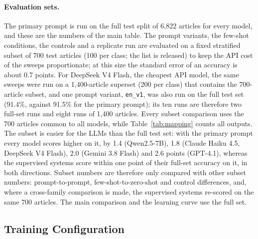 \documentclass[preprint,12pt,authoryear]{elsarticle}
\newif\ifrevmarkup
\DeclareRobustCommand{\rev}[1]{\ifrevmarkup{\color{blue}#1}\else#1\fi}
\begin{document}
\paragraph{\rev{Evaluation sets.}} \rev{The primary prompt is run on the full test split of 6,822 articles for every model, and these are the numbers of the main table. The prompt variants, the few-shot conditions, the controls and a replicate run are evaluated on a fixed stratified subset of 700 test articles (100 per class; the list is released) to keep the API cost of the sweeps proportionate; at this size the standard error of an accuracy is about 0.7 points. For DeepSeek V4 Flash, the cheapest API model, the same sweeps were run on a 1,400-article superset (200 per class) that contains the 700-article subset, and one prompt variant, \texttt{en\_v1}, was also run on the full test set (91.4\%, against 91.5\% for the primary prompt); its ten runs are therefore two full-set runs and eight runs of 1,400 articles. Every subset comparison uses the 700 articles common to all models, while Table~\ref{tab:mapping} counts all outputs. The subset is easier for the LLMs than the full test set: with the primary prompt every model scores higher on it, by 1.4 (Qwen2.5-7B), 1.8 (Claude Haiku 4.5, DeepSeek V4 Flash), 2.0 (Gemini 3.8 Flash) and 2.6 points (GPT-4.1), whereas the supervised systems score within one point of their full-set accuracy on it, in both directions. Subset numbers are therefore only compared with other subset numbers: prompt-to-prompt, few-shot-to-zero-shot and control differences, and, where a cross-family comparison is made, the supervised systems re-scored on the same 700 articles. The main comparison and the learning curve use the full set.}

\subsection{Training Configuration}
\label{training}
\end{document}
